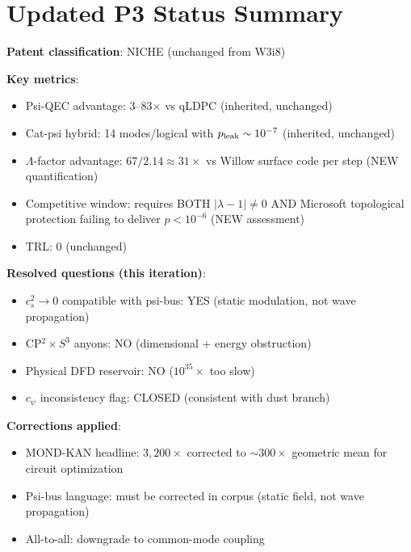 \documentclass[11pt]{article}
\theoremstyle{definition}
\theoremstyle{remark}
\newcommand{\lamdiff}{|\lambda-1|}
\begin{document}
\section{Updated P3 Status Summary}
\label{sec:status}

\begin{tcolorbox}[colback=green!5!white, colframe=green!60!black,
  title=\textbf{P3 STATUS after W4i16}]

\textbf{Patent classification}: NICHE (unchanged from W3i8)

\textbf{Key metrics}:
\begin{itemize}[nosep]
  \item Psi-QEC advantage: 3--83$\times$ vs qLDPC (inherited, unchanged)
  \item Cat-psi hybrid: 14 modes/logical with $p_{\rm leak} \sim 10^{-7}$
    (inherited, unchanged)
  \item $\Lambda$-factor advantage: $67/2.14 \approx 31\times$ vs Willow
    surface code per step (NEW quantification)
  \item Competitive window: requires BOTH $\lamdiff \neq 0$ AND Microsoft
    topological protection failing to deliver $p < 10^{-6}$ (NEW assessment)
  \item TRL: 0 (unchanged)
\end{itemize}

\textbf{Resolved questions (this iteration)}:
\begin{itemize}[nosep]
  \item $c_s^2 \to 0$ compatible with psi-bus: YES (static modulation, not
    wave propagation)
  \item CP$^2 \times S^3$ anyons: NO (dimensional + energy obstruction)
  \item Physical DFD reservoir: NO ($10^{35}\times$ too slow)
  \item $c_\psi$ inconsistency flag: CLOSED (consistent with dust branch)
\end{itemize}

\textbf{Corrections applied}:
\begin{itemize}[nosep]
  \item MOND-KAN headline: $3,200\times$ corrected to $\sim 300\times$
    geometric mean for circuit optimization
  \item Psi-bus language: must be corrected in corpus (static field, not
    wave propagation)
  \item All-to-all: downgrade to common-mode coupling
\end{itemize}


\end{tcolorbox}
\end{document}
